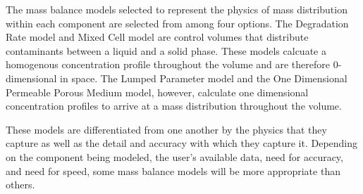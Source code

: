 The mass balance models selected to represent the physics of mass distribution 
within each component are selected from among four options. The Degradation Rate 
model and Mixed Cell model are control volumes that distribute contaminants 
between a liquid and a solid phase. These models calcuate a homogenous 
concentration profile throughout the volume and are therefore
0-dimensional in space. The Lumped Parameter model and the One Dimensional 
Permeable Porous Medium model, however, calculate one dimensional concentration 
profiles to arrive at a mass distribution throughout the volume. 

These models are differentiated from one another by the physics that they 
capture as well as the detail and accuracy with which they capture it.  
Depending on the component being modeled, the user's available data, need for 
accuracy, and need for speed, some mass balance models will be more appropriate 
than others.  

